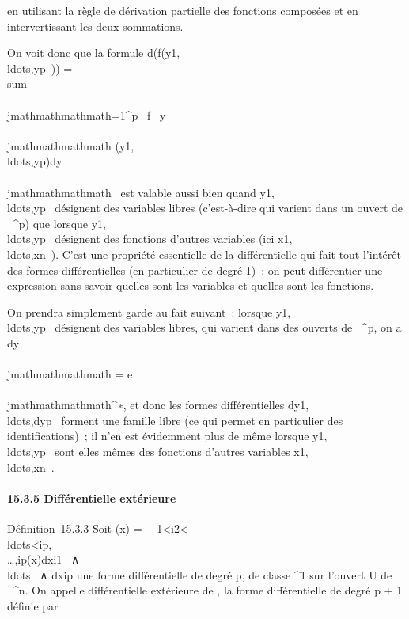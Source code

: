 en utilisant la règle de dérivation partielle des fonctions composées et
en intervertissant les deux sommations.

On voit donc que la formule
d(f(y1,\\ldots,yp~))
= \\sum ~
\\\\jmathmathmathmath=1^p \partial~f \over \partial~y\\\\jmathmathmathmath
(y1,\\ldots,yp)dy\\\\jmathmathmathmath~
est valable aussi bien quand
y1,\\ldots,yp~
désignent des variables libres (c'est-à-dire qui varient dans un ouvert
de ~^p) que lorsque
y1,\\ldots,yp~
désignent des fonctions d'autres variables (ici
x1,\\ldots,xn~).
C'est une propriété essentielle de la différentielle qui fait tout
l'intérêt des formes différentielles (en particulier de degré 1)~: on
peut différentier une expression sans savoir quelles sont les variables
et quelles sont les fonctions.

On prendra simplement garde au fait suivant~: lorsque
y1,\\ldots,yp~
désignent des variables libres, qui varient dans des ouverts de
~^p, on a dy\\\\jmathmathmathmath = e\\\\jmathmathmathmath^∗, et donc les
formes différentielles
dy1,\\ldots,dyp~
forment une famille libre (ce qui permet en particulier des
identifications)~; il n'en est évidemment plus de même lorsque
y1,\\ldots,yp~
sont elles mêmes des fonctions d'autres variables
x1,\\ldots,xn~.

\paragraph{15.3.5 Différentielle extérieure}

Définition~15.3.3 Soit \omega(x) =\
\sum ~
1\textless{}i2\textless{}\\ldots\textless{}ip,\\\ldots,ip(x)dxi1~
∧\\ldots~ ∧
dxip une forme différentielle de degré p, de classe
^1 sur l'ouvert U de ~^n. On appelle
différentielle extérieure de \omega, la forme différentielle de degré p + 1
définie par

